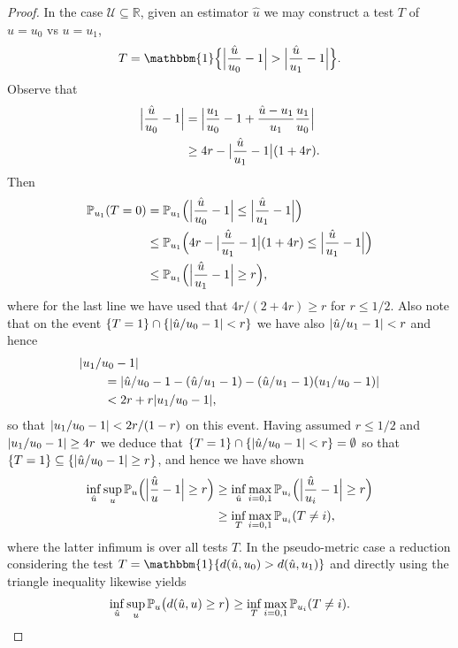 \documentclass[journal]{IEEEtran}
\newcommand{\1}{\boldsymbol{1}}
\newcommand{\PP}{\mathbb{P}}
\DeclarePairedDelimiter{\braces}{\{}{\}}
\DeclarePairedDelimiter{\brackets}{(}{)}
\DeclarePairedDelimiter{\abs}{\lvert}{\rvert}
\newcommand{\RR}{\mathbb{R}}
\newcommand{\II}{\mathbbm{1}}
\begin{document}
\begin{proof}
In the case $\mathcal{U}\subseteq \RR$,	given an estimator $\hat{u}$ we may construct a test $T$ of $u=u_0$ vs $u=u_1$,
	\[ T=\II\braces[\Big]{\abs[\Big]{\frac{\hat{u}}{u_0}-1}>\abs[\Big]{\frac{\hat{u}}{u_1}-1}}.\]
	Observe that
	\begin{align*}
		\abs[\Big]{\frac{\hat{u}}{u_0}-1} &= \abs[\Big]{\frac{u_1}{u_0}-1 + \frac{\hat{u}-u_1}{u_1}\frac{u_1}{u_0}} \\
		&\geq 4r - \abs[\big]{\frac{\hat{u}}{u_1}-1}(1+4r).
	\end{align*}
	Then \begin{align*}
		\PP_{u_1}\brackets{T=0}&=\PP_{u_1}\brackets[\Big]{\abs[\Big]{\frac{\hat{u}}{u_0}-1}\leq\abs[\Big]{\frac{\hat{u}}{u_1}-1}} \\
		&\leq \PP_{u_1}\brackets[\Big]{4r-\abs[\big]{\frac{\hat{u}}{u_1}-1}(1+4r)\leq \abs[\Big]{\frac{\hat{u}}{u_1}-1}} \\
		&\leq  \PP_{u_1}\brackets[\Big]{\abs[\Big]{\frac{\hat{u}}{u_1}-1}\geq r},
	\end{align*}
	where for the last line we have used that $4r/(2+4r)\geq r$ for $r\leq 1/2$.
	Also note that on the event $\braces{T=1}\cap\braces{\abs{\hat{u}/u_0-1}<r}$ we have also $\abs{\hat{u}/u_1-1}<r$ and hence
	\begin{align*}
          &\abs{u_1/u_0-1}\\
          &\qquad=\abs{\hat{u}/u_0-1-(\hat{u}/u_1-1) - (\hat{u}/u_1-1)(u_1/u_0-1)} \\
		&\qquad< 2r+r\abs{u_1/u_0-1},
	\end{align*}
	so that $\abs{u_1/u_0-1}<2r/(1-r)$ on this event. Having assumed $r\leq 1/2$ and $\abs{u_1/u_0-1}\geq 4r$ we deduce that $\braces{T=1}\cap\braces{\abs{\hat{u}/u_0-1}<r}=\emptyset$ so that $\braces{T=1}\subseteq \braces{\abs{\hat{u}/u_0-1}\geq r}$, and hence we have shown
        \begin{align*}
          \inf_{\hat{u}}\sup_{u} \PP_u\brackets[\Big]{\abs[\Big]{\frac{\hat{u}}{u}-1}\geq r}%
          &\geq \inf_{\hat{u}} \max_{i=0,1} \PP_{u_i}\brackets[\Big]{\abs[\Big]{\frac{\hat{u}}{u_i}-1}\geq r}\\
          &\geq \inf_T \max_{i=0,1} \PP_{u_i}\brackets{T\neq i},
        \end{align*}
	where the latter infimum is over all tests $T$.
	In the pseudo-metric case a reduction considering the test $T=\II\braces{d(\hat{u},u_0)>d(\hat{u},u_1)}$ and directly using the triangle inequality likewise yields
	\[ \inf_{\hat{u}}\sup_{u} \PP_u\brackets[\big]{d(\hat{u},u)\geq r} \geq \inf_T \max_{i=0,1} \PP_{u_i}\brackets{T\neq i}.\]


\end{proof}
\end{document}
